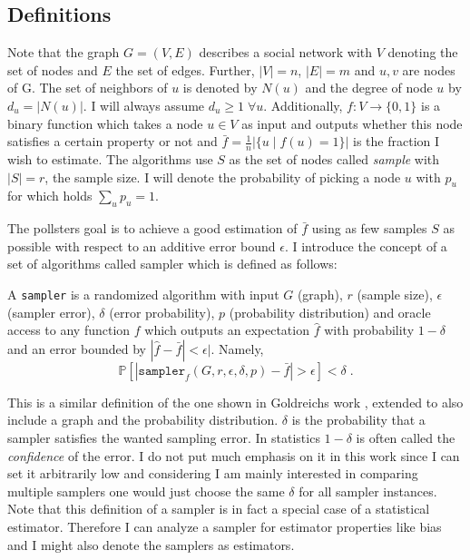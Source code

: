 \label{algorithms}
\subsection{Definitions}
Note that the graph $G = (V,E)$ describes a social network with $V$ denoting the set of nodes and $E$ the set of edges. Further, $|V| = n$, $|E| = m$ and $u,v$ are nodes of G. The set of neighbors of $u$ is denoted by $N(u)$ and the degree of node $u$ by $d_u=|N(u)|$. I will always assume $d_u\geq1\;\forall u$. Additionally, $f : V \rightarrow \{0,1\}$ is a binary function which takes a node $u \in V$ as input and outputs whether this node satisfies a certain property or not and $\bar{f} = \frac{1}{n}|\{u\;|\;f(u) = 1\}|$ is the fraction I wish to estimate.
The algorithms use $S$ as the set of nodes called \textit{sample} with $|S| = r$, the sample size.
I will denote the probability of picking a node $u$ with $p_u$ for which holds $\sum_up_u = 1$.

The pollsters goal is to achieve a good estimation of $\bar{f}$ using as few samples $S$ as possible with respect to an additive error bound $\epsilon$.
I introduce the concept of a set of algorithms called sampler which is defined as follows:
\begin{definition}[sampler]
\label{defsampler}
  A \texttt{sampler} is a randomized algorithm with input $G$ (graph), $r$ (sample size), $\epsilon$ (sampler error), $\delta$ (error probability), $p$ (probability distribution) and oracle access to any function $f$ which outputs an expectation $\hat{f}$ with probability $1-\delta$ and an error bounded by $|\hat{f}-\bar{f}|<\epsilon|$. Namely,
  $$\mathds{P}[|\texttt{sampler}_f(G, r,\epsilon,\delta,p)-\bar{f} | > \epsilon] < \delta \;.$$
\end{definition}
This is a similar definition of the one shown in Goldreichs work \cite{goldreich1997sample}, extended to also include a graph and the probability distribution. 
$\delta$ is the probability that a sampler satisfies the wanted sampling error. In statistics $1-\delta$ is often called the \textit{confidence} of the error. I do not put much emphasis on it in this work since I can set it arbitrarily low and considering I am mainly interested in comparing multiple samplers one would just choose the same $\delta$ for all sampler instances.
Note that this definition of a sampler is in fact a special case of a statistical estimator.
Therefore I can analyze a sampler for estimator properties like bias and I might also denote the samplers as estimators.

